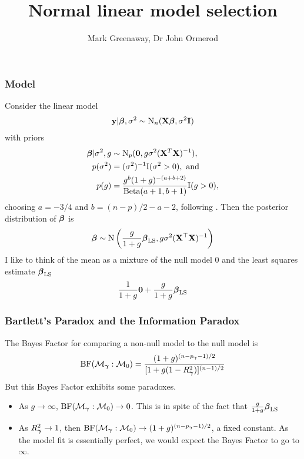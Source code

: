 \documentclass{beamer}
\title{Normal linear model selection}
\author{Mark Greenaway, Dr John Ormerod}
\begin{document}
\begin{frame}
	\titlepage
\end{frame}
			
\begin{frame}
	\frametitle{Model}
	Consider the linear model
	\begin{align*}
		{\bf y} | {\boldsymbol \beta}, \sigma^2 \sim \text{N}_n({\bf X} {\boldsymbol \beta}, \sigma^2 {\bf I}) 
	\end{align*}
	with priors
	\begin{align*}
		{\boldsymbol\beta} | \sigma^2, g & \sim \text{N}_p({\bf 0}, g \sigma^2 ({\bf X}^T {\bf X})^{-1}),                     \\
		p(\sigma^2)          & = (\sigma^2)^{-1} \text{I}(\sigma^2 > 0), \text{ and }                    \\
		p(g)                 & = \frac{g^b (1 + g)^{-(a + b + 2)}}{\text{Beta}(a + 1, b + 1)} \text{I}(g > 0), 
	\end{align*}
	choosing $a = -3/4$ and $b = (n-p)/2 - a - 2$, following \citep{Maruyama2011}.
	Then the posterior distribution of ${\boldsymbol \beta}$ is
	\[
		{\boldsymbol \beta} \sim \text{N}\left(\frac{g}{1 + g} {\boldsymbol \beta}_{\text{LS}}, g \sigma^2 ({\bf X}^\top {\bf X})^{-1}\right)
	\]
	I like to think of the mean as a mixture of the null model $0$ and the least squares estimate ${\boldsymbol \beta}_{\text{LS}}$
	\[
		\frac{1}{1 + g} {\bf 0} + \frac{g}{1 + g} {\boldsymbol \beta}_{\text{LS}}
	\]
\end{frame}

\begin{frame}
	\frametitle{Bartlett's Paradox and the Information Paradox}
	The Bayes Factor for comparing a non-null model to the null model is
	\[
		\text{BF}(\mathcal{M}_{\boldsymbol \gamma} : \mathcal{M}_0) = \frac{(1 + g)^{(n - p_{\boldsymbol \gamma} - 1)/2}}{[1 + g (1 - R_{\boldsymbol \gamma}^2)]^{(n - 1)/2}}
	\]
	But this Bayes Factor exhibits some paradoxes.
	\begin{itemize}
		\item As $g \to \infty$, $\text{BF}(\mathcal{M}_{\boldsymbol \gamma} : \mathcal{M}_0) \to 0$. This is in spite of the fact
					that $\frac{g}{1 + g} {\boldsymbol \beta}_{\text{LS}}$
		\item As $R_{\boldsymbol \gamma}^2 \to 1$, then 
					$\text{BF}(\mathcal{M}_{\boldsymbol \gamma} : \mathcal{M}_0) \to (1 + g)^{(n - p_{\boldsymbol \gamma} - 1)/2}$, a fixed constant.
					As the model fit is essentially perfect, we would expect the Bayes Factor to go to $\infty$.
	\end{itemize}

\end{frame}
\end{document}
